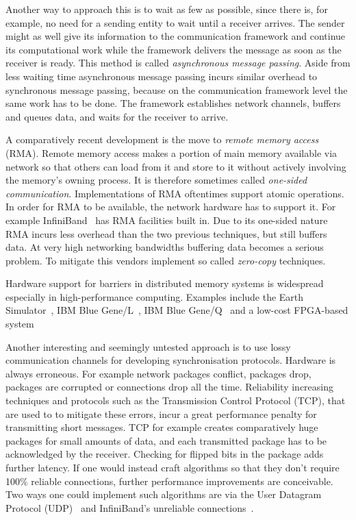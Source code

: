 \documentclass[a4paper, 10pt]{article}
\begin{document}
Another way to approach this is to wait as few as possible, since there is, for example, no need for a sending entity to wait until a receiver arrives. The sender might as well give its information to the communication framework and continue its computational work while the framework delivers the message as soon as the receiver is ready. This method is called \emph{asynchronous message passing}. Aside from less waiting time asynchronous message passing incurs similar overhead to synchronous message passing, because on the communication framework level the same work has to be done. The framework establishes network channels, buffers and queues data, and waits for the receiver to arrive.

A comparatively recent development is the move to \emph{remote memory access} (RMA). Remote memory access makes a portion of main memory available via network so that others can load from it and store to it without actively involving the memory's owning process. It is therefore sometimes called \emph{one-sided communication}. Implementations of RMA oftentimes support atomic operations.
In order for RMA to be available, the network hardware has to support it. For example InfiniBand~\cite{infiniband} has RMA facilities built in.
Due to its one-sided nature RMA incurs less overhead than the two previous techniques, but still buffers data. At very high networking bandwidths buffering data becomes a serious problem. To mitigate this vendors implement so called \emph{zero-copy} techniques.

Hardware support for barriers in distributed memory systems is widespread especially in high-performance computing. Examples include the Earth Simulator~\cite{earthsimulator}, IBM Blue Gene/L~\cite{bluegenel}, IBM Blue Gene/Q~\cite{bluegeneq} and a low-cost FPGA-based system~\cite{hoefler2006b}

Another interesting and seemingly untested approach is to use lossy communication channels for developing synchronisation protocols. Hardware is always erroneous. For example network packages conflict, packages drop, packages are corrupted or connections drop all the time. Reliability increasing techniques and protocols such as the Transmission Control Protocol (TCP), that are used to to mitigate these errors, incur a great performance penalty for transmitting short messages. TCP for example creates comparatively huge packages for small amounts of data, and each transmitted package has to be acknowledged by the receiver. Checking for flipped bits in the package adds further latency.
If one would instead craft algorithms so that they don't require 100\% reliable connections, further performance improvements are conceivable.
Two ways one could implement such algorithms are via the User Datagram Protocol (UDP)~\cite{udp} and InfiniBand's unreliable connections~\cite{infiniband}.
\end{document}
